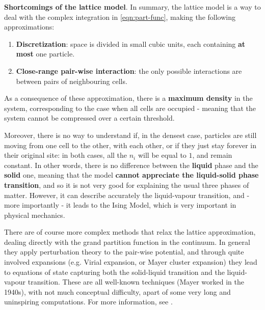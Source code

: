 \documentclass[../../main.tex]{subfiles}
\begin{document}
\begin{appr}
    \textbf{Shortcomings of the lattice model}. In summary, the lattice model is a way to deal with the complex integration in \ref{eqn:part-func}, making the following approximations:
    \begin{enumerate}
        \item \textbf{Discretization}: space is divided in small cubic units, each containing \textbf{at most} one particle. 
        \item \textbf{Close-range pair-wise interaction}: the only possible interactions are between pairs of neighbouring cells.
    \end{enumerate}
    As a consequence of these approximation, there is a \textbf{maximum density} in the system, corresponding to the case when all cells are occupied - meaning that the system cannot be compressed over a certain threshold.
    
    Moreover, there is no way to understand if, in the densest case, particles are still moving from one cell to the other,  with each other, or if they just stay forever in their original site: in both cases, all the $n_i$ will be equal to $1$, and remain constant. In other words, there is no difference between the \textbf{liquid} phase and the \textbf{solid} one, meaning that the model \textbf{cannot appreciate the liquid-solid phase transition}, and so it is not very good for explaining the usual three phases of matter. However, it can describe accurately the liquid-vapour transition, and - more importantly - it leads to the Ising Model, which is very important in physical mechanics.

    \medskip

    There are of course more complex methods that relax the lattice approximation, dealing directly with the grand partition function in the continuum. In general they apply perturbation theory to the pair-wise potential, and through quite involved expansions (e.g. Virial expansion, or Mayer cluster expansion) they lead to equations of state capturing both the solid-liquid transition and the liquid-vapour transition. These are all well-known techniques (Mayer worked in the 1940s), with not much conceptual difficulty, apart of some very long and uninspiring computations. For more information, see \cite{huang}. 
\end{appr}
\end{document}
